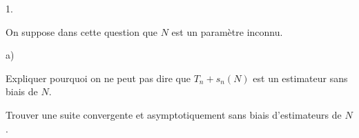 \begin{exerciceAP}
\begin{noliste}{1.}
    \item On suppose dans cette question que $N$ est un paramètre 
    inconnu.
    \begin{noliste}{a)}
    \setlength{\itemsep}{2mm}
      \item Expliquer pourquoi on ne peut pas dire que $T_n + s_n(N)$
      est un estimateur sans biais de $N$.
      
      \item Trouver une suite convergente et asymptotiquement sans 
      biais d'estimateurs de $N$.
    \end{noliste}
  \end{noliste}
\end{exerciceAP} 



